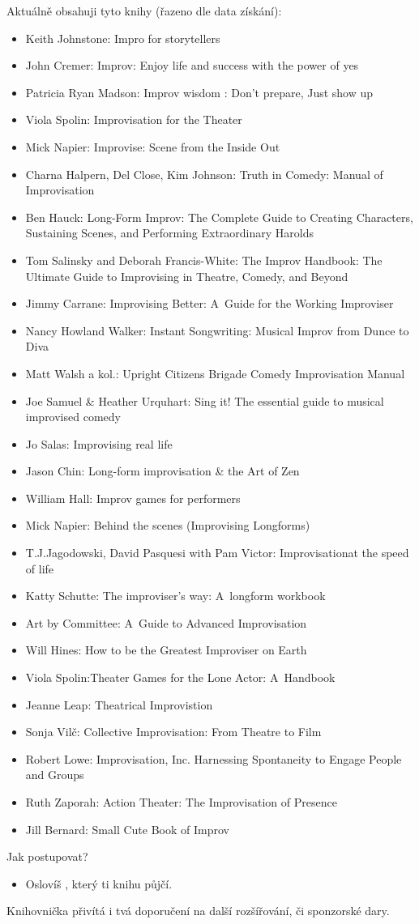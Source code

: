 Aktuálně obsahuji tyto knihy (řazeno dle data získání): 
\begin{itemize}
\item Keith Johnstone: Impro for storytellers
\item John Cremer: Improv: Enjoy life and success with the power of yes
\item Patricia Ryan Madson: Improv wisdom : Don't prepare, Just show up
\item Viola Spolin: Improvisation for the Theater
\item Mick Napier: Improvise: Scene from the Inside Out
\item Charna Halpern, Del Close, Kim   Johnson: Truth in Comedy: Manual of Improvisation
\item Ben Hauck: Long-Form Improv: The Complete Guide to Creating Characters, Sustaining Scenes, and Performing Extraordinary Harolds
\item Tom Salinsky and Deborah Francis-White: The Improv Handbook: The Ultimate Guide to Improvising in Theatre, Comedy, and Beyond
\item Jimmy Carrane: Improvising Better: A~Guide for the Working Improviser
\item Nancy Howland Walker: Instant Songwriting: Musical Improv from Dunce to Diva
\item Matt Walsh a kol.: Upright Citizens Brigade Comedy Improvisation Manual
\item Joe Samuel & Heather Urquhart: Sing it! The essential guide to musical improvised comedy
\item Jo Salas: Improvising real life
\item Jason Chin: Long-form improvisation & the Art of Zen
\item William Hall: Improv games for performers
\item Mick Napier: Behind the scenes (Improvising Longforms)
\item T.J.Jagodowski, David Pasquesi with Pam Victor: Improvisationat the speed of life
\item Katty Schutte: The improviser's way: A~longform workbook
\item Art by Committee: A~Guide to Advanced Improvisation
\item Will Hines: How to be the Greatest Improviser on Earth
\item Viola Spolin:Theater Games for the Lone Actor: A~Handbook
\item Jeanne Leap: Theatrical Improvistion
\item Sonja Vilč: Collective Improvisation: From Theatre to Film
\item Robert Lowe: Improvisation, Inc. Harnessing Spontaneity to Engage People and Groups
\item Ruth Zaporah: Action Theater: The Improvisation of Presence
\item Jill Bernard: Small Cute Book of  Improv
\end{itemize}
 
 
 
Jak postupovat? 
 
\begin{itemize}
\item  Oslovíš , který ti knihu půjčí.
\end{itemize}
 
Knihovnička přivítá i tvá doporučení na další rozšířování, či sponzorské dary. 
